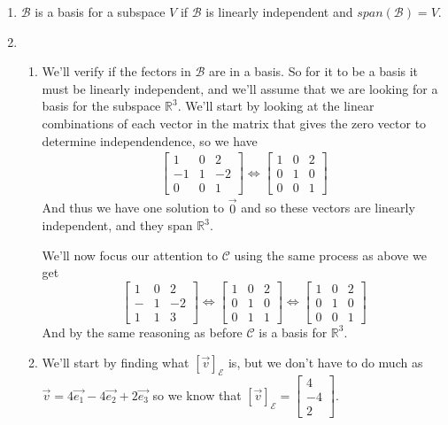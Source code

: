 \documentclass[notoc,notitlepage]{tufte-book}
\newcommand\mat[1]{\begin{bmatrix}#1\end{bmatrix}}
\begin{document}
\begin{enumerate}
    \item $\mathcal{B}$ is a basis for a subspace $V$ if $\mathcal{B}$ is linearly independent and $\mathit{span} {\left( \mathcal{B} \right)}  = V$. 
    \item 
        \begin{enumerate}
            \item We'll verify if the fectors in $\mathcal{B}$ are in a basis. So for it to be a basis it must be linearly independent, and we'll assume that we are looking for a basis for the subspace $\mathbb{R}^{3}$. We'll start by looking at the linear combinations of each vector in the matrix that gives the zero vector to determine independendence, so we have 
                \begin{gather*}
                    \mat{ 1 & 0 & 2 \\ -1 & 1 & -2 \\ 0 & 0 & 1 } \Leftrightarrow \mat{ 1 & 0 & 2 \\ 0 & 1 & 0 \\ 0 & 0 & 1 }
                \end{gather*}
                And thus we have one solution to $\vec{0}$ and so these vectors are linearly independent, and they span $\mathbb{R}^{3}$. 

                We'll now focus our attention to $\mathcal{C}$ using the same process as above we get
                \begin{equation*}
                    \mat{ 1 & 0 & 2 \\ - & 1 & -2 \\ 1 & 1 & 3 } \Leftrightarrow \mat{ 1 & 0 & 2 \\ 0 & 1 & 0 \\ 0 & 1 & 1 } \Leftrightarrow \mat{ 1 & 0 & 2 \\ 0 & 1 & 0 \\ 0 & 0 & 1 }
                \end{equation*}
                And by the same reasoning as before $\mathcal{C}$  is a basis for $\mathbb{R}^{3}$. 
            \item We'll start by finding what $\left[ \vec{v} \right]_{\mathcal{E}}$ is, but we don't have to do much as $\vec{v} = 4\vec{e_1} - 4\vec{e_2} + 2\vec{e_3}$ so we know that $\left[ \vec{v} \right]_{\mathcal{E}} = \mat{ 4 \\ -4 \\ 2 }$.


\end{enumerate}
\end{enumerate}
\end{document}
